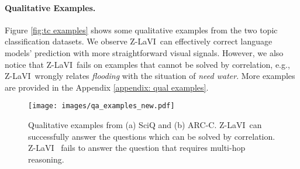 \documentclass[11pt]{article}
\newcommand{\model}{Z-LaVI}
\begin{document}
\paragraph{Qualitative Examples.} Figure \ref{fig:tc examples} shows some qualitative examples from the two topic classification datasets. We observe \model~can effectively correct language models' prediction with more straightforward visual signals. However, we also notice that \model~fails on examples that cannot be solved by correlation, e.g., \model~wrongly relates \textit{flooding} with the situation of \textit{need water}. More examples are provided in the Appendix \ref{appendix: qual examples}.

\begin{figure}[!t]
\centering
    \texttt{[image: images/qa\_examples\_new.pdf]}
    \caption{Qualitative examples from (a) SciQ and (b) ARC-C. \model~can successfully answer the questions which can be solved by correlation. \model~ fails to answer the question that requires multi-hop reasoning.}
    \label{fig:qa_examples}
    \vspace{-.15cm}
\end{figure}
\end{document}

